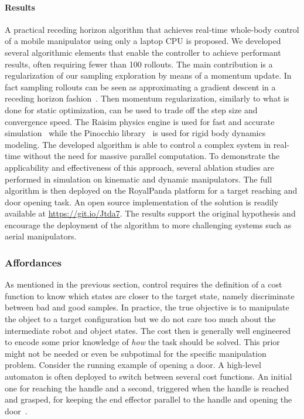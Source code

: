 \paragraph{Results} A practical receding horizon algorithm that achieves real-time whole-body control of a mobile manipulator using only a laptop CPU is proposed. We developed several algorithmic elements that enable the controller to achieve performant results, often requiring fewer than 100 rollouts. The main contribution is a regularization of our sampling exploration by means of a momentum update. In fact sampling rollouts can be seen as approximating a gradient descent in a receding horizon fashion~\cite{lambert_stein_2020}. Then momentum regularization, similarly to what is done for static optimization, can be used to trade off the step size and convergence speed. The Raisim physics engine is used for fast and accurate simulation~\cite{raisim} while the Pinocchio library~\cite{pinocchioweb} is used for rigid body dynamics modeling. The developed algorithm is able to control a complex system in real-time without the need for massive parallel computation. To demonstrate the applicability and effectiveness of this approach, several ablation studies are performed in simulation on kinematic and dynamic manipulators. The full algorithm is then deployed on the RoyalPanda platform for a target reaching and door opening task. An open source implementation of the solution is readily available at \url{https://git.io/Jtda7}. The results support the original hypothesis and encourage the deployment of the algorithm to more challenging systems such as aerial manipulators.

\subsubsection{Affordances}
As mentioned in the previous section, control requires the definition of a cost function to know which states are closer to the target state, namely discriminate between bad and good samples. In practice, the true objective is to manipulate the object to a target configuration but we do not care too much about the intermediate robot and object states. The cost then is generally well engineered to encode some prior knowledge of \emph{how} the task should be solved. This prior might not be needed or even be subpotimal for the specific manipulation problem. Consider the running example of opening a door. A high-level automaton is often deployed to switch between several cost functions. An initial one for reaching the handle and a second, triggered when the handle is reached and grasped, for keeping the end effector parallel to the handle and opening the door~\cite{abraham_model-based_2020}. 

